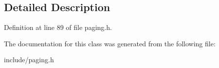 \subsection{Detailed Description}


Definition at line 89 of file paging.\-h.



The documentation for this class was generated from the following file\-:\begin{DoxyCompactItemize}
\item 
include/paging.\-h\end{DoxyCompactItemize}
